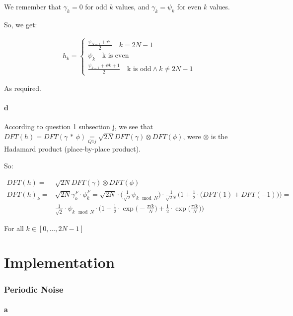 \documentclass[english]{extarticle}
\numberwithin{equation}{section}
\numberwithin{figure}{section}
\begin{document}
We remember that $\gamma_{k}=0$ for odd $k$ values, and $\gamma_k=\psi_k$ for even $k$ values.

So, we get: 

\begin{align*}
    h_{k} = \begin{cases}
        \frac{\psi_{N-1} + \psi_0}{2} \quad k=2N-1 \\
        \psi_k \quad \text{k is even} \\
        \frac{\psi_{k-1} + \psi{k+1}}{2} \quad \text{k is odd} \land k\neq 2N-1
    \end{cases}
\end{align*}

As required.

\subsection*{d}

According to question 1 subsection j, we see that $DFT(h)=DFT(\gamma \, * \, \phi) \underset{Q1j}{=} \sqrt{2N} DFT(\gamma) \otimes DFT(\phi)$, were $\otimes$ is the Hadamard product (place-by-place product).

So:

\begin{align*}
    DFT(h) = & \sqrt{2N} DFT(\gamma) \otimes DFT(\phi) \\
    DFT(h)_k = & \sqrt{2N} \gamma_k^F \cdot \phi_k^F = \sqrt{2N} \cdot \Big( \frac{1}{\sqrt{2}} \psi_{k\mod N} \Big) \cdot \frac{1}{\sqrt{2N}} \Big( 1 + \frac{1}{2} \cdot \big( DFT(1) + DFT(-1) \big) \Big) = \\
    & \frac{1}{\sqrt{2}} \cdot \psi_{k\mod N} \cdot \Big( 1 + \frac{1}{2} \cdot \exp \big(-\frac{\pi ik}{N} \big) + \frac{1}{2} \cdot \exp \big( \frac{\pi ik}{N} \big) \Big)
\end{align*}

For all $k \in [0,\dots,2N-1] $

\newpage

\part{Implementation}

\section{Periodic Noise}

\subsection*{a}
\end{document}
